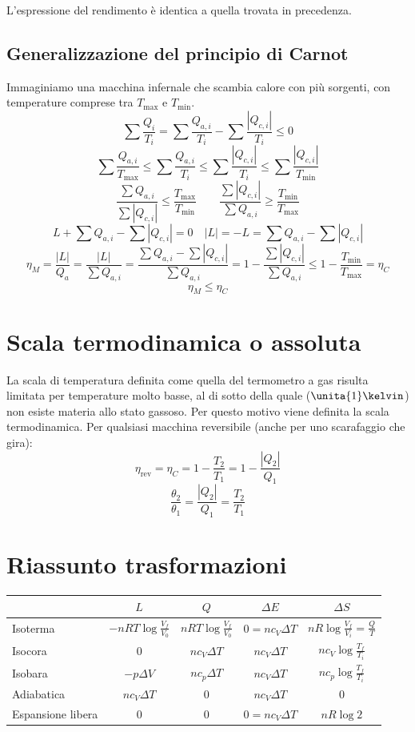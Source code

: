 L'espressione del rendimento è identica a quella trovata in precedenza.
\subsection{Generalizzazione del principio di Carnot}
Immaginiamo una macchina infernale che scambia calore con più sorgenti, con temperature comprese tra $T_{\max}$ e $T_{\min}$.
$$\sum\frac{Q_i}{T_i}=\sum\frac{Q_{a,i}}{T_i}-\sum\frac{|Q_{c,i}|}{T_i}\leq 0$$
$$\sum\frac{Q_{a,i}}{T_{\max}} \leq \sum\frac{Q_{a,i}}{T_i}\leq\sum\frac{|Q_{c,i}|}{T_i}\leq\sum\frac{|Q_{c,i}|}{T_{\min}}$$
$$\frac{\sum Q_{a,i}}{\sum|Q_{c,i}|}\leq\frac{T_{\max}}{T_{\min}}\qquad \frac{\sum |Q_{c,i}|}{\sum Q_{a,i}}\geq\frac{T_{\min}}{T_{\max}}$$
$$L+\sum Q_{a,i}-\sum|Q_{c,i}|=0\quad |L|=-L=\sum Q_{a,i}-\sum|Q_{c,i}|$$
$$\eta_M=\frac{|L|}{Q_a}=\frac{|L|}{\sum Q_{a,i}}=\frac{\sum Q_{a,i}-\sum |Q_{c,i}|}{\sum Q_{a,i}}=1-\frac{\sum|Q_{c,i}|}{\sum Q_{a,i}}\leq 1-\frac{T_{\min}}{T_{\max}}=\eta_C$$
$$\eta_M\leq\eta_C$$


\section{Scala termodinamica o assoluta}
La scala di temperatura definita come quella del termometro a gas risulta limitata per temperature molto basse, al di sotto della quale ($\unita{1}\kelvin$) non esiste materia allo stato gassoso. Per questo motivo viene definita la scala termodinamica. Per qualsiasi macchina reversibile (anche per uno scarafaggio che gira):
$$\eta_\text{rev}=\eta_C=1-\frac{T_2}{T_1}=1-\frac{|Q_2|}{Q_1}$$
$$\frac{\theta_2}{\theta_1}=\frac{|Q_2|}{Q_1}=\frac{T_2}{T_1}$$



\section{Riassunto trasformazioni}
\begin{center}
\begin{tabular}{p{2cm}|cccc}
&$L$&$Q$&$\Delta E$&$\Delta S$\\
\hline
Isoterma&$-nRT\log\frac{V_f}{V_0}$&$nRT\log\frac{V_f}{V_0}$&$0=nc_V\Delta T$&$nR\log\frac{V_f}{V_i}=\frac{Q}{T}$\\
Isocora&$0$&$nc_V\Delta T$&$nc_V\Delta T$&$nc_V\log\frac{T_f}{T_i}$\\
Isobara&$-p\Delta V$&$nc_p\Delta T$&$nc_V\Delta T$&$nc_p\log\frac{T_f}{T_i}$\\
Adiabatica&$nc_V\Delta T$&$0$&$nc_V\Delta T$&$0$\\
Espansione libera&$0$&$0$&$0=nc_V\Delta T$&$nR\log 2$\\
\end{tabular}
\end{center}


